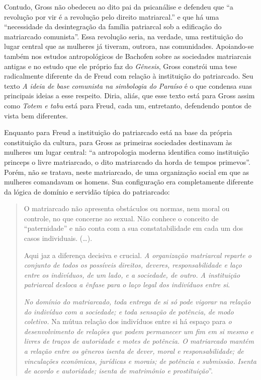 Contudo, Gross não obedeceu ao dito pai da psicanálise e defendeu que
``a revolução por vir é a revolução pelo direito matriarcal.'' e que há
uma ``necessidade da desintegração da família patriarcal sob a
edificação do matriarcado comunista''. Essa revolução seria, na
verdade, uma restituição do lugar central que as mulheres já tiveram,
outrora, nas comunidades. Apoiando-se também nos estudos antropológicos
de Bachofen sobre as sociedades matriarcais antigas e no estudo que ele
próprio faz do \emph{Gênesis}, Gross constrói uma tese radicalmente
diferente da de Freud com relação à instituição do patriarcado. Seu
texto \emph{A ideia de base comunista na simbologia do Paraíso} é o que
condensa suas principais ideias a esse respeito. Diria, aliás, que esse
texto está para Gross assim como \emph{Totem e tabu} está para Freud,
cada um, entretanto, defendendo pontos de vista bem diferentes.

Enquanto para Freud a instituição do patriarcado está na base da própria
constituição da cultura, para Gross as primeiras sociedades destinavam
às mulheres um lugar central: ``a antropologia moderna identifica como
instituição princeps o livre matriarcado, o dito matriarcado da horda de
tempos primevos''. Porém, não se tratava, neste matriarcado, de uma
organização social em que as mulheres comandavam os homens. Sua
configuração era completamente diferente da lógica de domínio e servidão
típica do patriarcado:

\begin{quote}
O matriarcado não apresenta obstáculos ou normas, nem moral ou controle,
no que concerne ao sexual. Não conhece o conceito de ``paternidade'' e
não conta com a sua constatabilidade em cada um dos casos individuais.
(\ldots{}).

Aqui jaz a diferença decisiva e crucial. \emph{A organização matriarcal
reparte o conjunto de todos os possíveis direitos, deveres,
responsabilidade e laço entre os indivíduos, de um lado, e a sociedade,
de outro. A instituição patriarcal desloca a ênfase para o laço legal
dos indivíduos entre si}.

\emph{No domínio do matriarcado, toda entrega de si só pode vigorar na
relação do indivíduo com a sociedade; e toda sensação de potência, de
modo coletivo.} Na mútua relação dos indivíduos entre si há espaço para
\emph{o desenvolvimento de relações que podem permanecer um fim em si
mesmo} \emph{e livres de traços de autoridade e motes de potência. O
matriarcado mantém a relação entre os gêneros isenta de dever, moral e
responsabilidade; de vinculações econômicas, jurídicas e morais; de
potência e submissão. Isenta de acordo e autoridade; isenta de
matrimônio e prostituição}''.
\end{quote}

